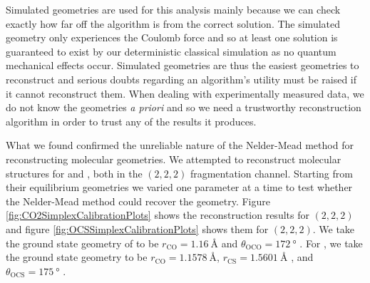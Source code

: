 Simulated geometries are used for this analysis mainly because we can check exactly how far off the algorithm is from the correct solution. The simulated geometry only experiences the Coulomb force and so at least one solution is guaranteed to exist by our deterministic classical simulation as no quantum mechanical effects occur. Simulated geometries are thus the easiest geometries to reconstruct and serious doubts regarding an algorithm's utility must be raised if it cannot reconstruct them. When dealing with experimentally measured data, we do not know the geometries \textit{a priori} and so we need a trustworthy reconstruction algorithm in order to trust any of the results it produces.

What we found confirmed the unreliable nature of the Nelder-Mead method for reconstructing molecular geometries. We attempted to reconstruct molecular structures for  and , both in the $(2,2,2)$ fragmentation channel. Starting from their equilibrium geometries we varied one parameter at a time to test whether the Nelder-Mead method could recover the geometry. Figure \ref{fig:CO2SimplexCalibrationPlots} shows the reconstruction results for  $(2,2,2)$ and figure \ref{fig:OCSSimplexCalibrationPlots} shows them for  $(2,2,2)$. We take the ground state geometry of  to be $r_\mathrm{CO} = \SI{1.16}{\angstrom}$ \citep{ChemistryOfTheElements} and $\theta_\mathrm{OCO} = \SI{172}{\degree}$ \citep{Siegmann02, Mathur92}. For , we take the ground state geometry to be $r_\mathrm{CO} = \SI{1.1578}{\angstrom}$, $r_\mathrm{CS} = \SI{1.5601}{\angstrom}$ \citep{CRCHandbook88ed}, and $\theta_\mathrm{OCS} = \SI{175}{\degree}$ \citep{Wales12HCI}.

